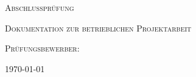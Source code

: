 \begin{titlepage}
	\centering
	{\scshape\LARGE Abschlussprüfung \pruefungstermin \par}
	\vspace{1cm}
	{\scshape\LARGE \ausbildungsberuf \par}
	\vspace{1cm}
	{\scshape\Large Dokumentation zur betrieblichen Projektarbeit \par}
	\vspace{1cm}
	{\huge\bfseries\titel \par}
	{\scshape\Large \untertitel \par}
	\vspace{2cm}
	{\scshape\Large Prüfungsbewerber: \par}
	{\Large\itshape \autorName \par}
	{\Large\itshape \autorAnschrift \par}
	{\Large\itshape \autorOrt \par}
	\vfill

	{\large \today\par}
\end{titlepage}